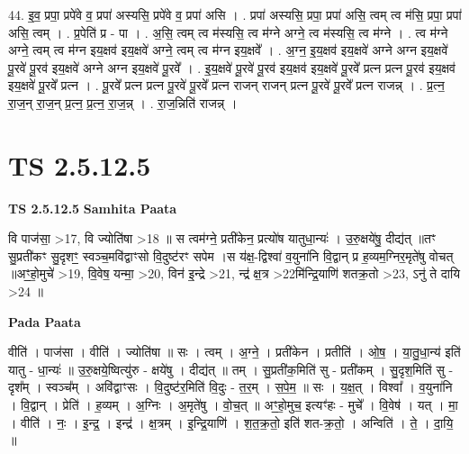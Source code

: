 \documentclass[17pt]{extarticle}
\begin{document}
44. इ॒व॒ प्रपा॒ प्रपे॑वे व॒ प्रपा॑ अस्यसि॒ प्रपे॑वे व॒ प्रपा॑ असि । . प्रपा॑ अस्यसि॒ प्रपा॒ प्रपा॑ असि॒ त्वम् त्व म॑सि॒ प्रपा॒ प्रपा॑ असि॒ त्वम् । . प्र॒पेति॑ प्र - पा । . अ॒सि॒ त्वम् त्व म॑स्यसि॒ त्व म॑ग्ने अग्ने॒ त्व म॑स्यसि॒ त्व म॑ग्ने । . त्व म॑ग्ने अग्ने॒ त्वम् त्व म॑ग्न इय॒क्षव॑ इय॒क्षवे॑ अग्ने॒ त्वम् त्व म॑ग्न इय॒क्षवे᳚ । . अ॒ग्न॒ इ॒य॒क्षव॑ इय॒क्षवे॑ अग्ने अग्न इय॒क्षवे॑ पू॒रवे॑ पू॒रव॑ इय॒क्षवे॑ अग्ने अग्न इय॒क्षवे॑ पू॒रवे᳚ । . इ॒य॒क्षवे॑ पू॒रवे॑ पू॒रव॑ इय॒क्षव॑ इय॒क्षवे॑ पू॒रवे᳚ प्रत्न प्रत्न पू॒रव॑ इय॒क्षव॑ इय॒क्षवे॑ पू॒रवे᳚ प्रत्न । . पू॒रवे᳚ प्रत्न प्रत्न पू॒रवे॑ पू॒रवे᳚ प्रत्न राजन् राजन् प्रत्न पू॒रवे॑ पू॒रवे᳚ प्रत्न राजन्न् । . प्र॒त्न॒ रा॒ज॒न् रा॒ज॒न् प्र॒त्न॒ प्र॒त्न॒ रा॒ज॒न्न् । . रा॒ज॒न्निति॑ राजन्न् । \newline
\pagebreak
{}

\section{ TS 2.5.12.5 }

\textbf{TS 2.5.12.5 } \newline
\textbf{Samhita Paata} \newline

वि पाज॑सा॒ >17, वि ज्योति॑षा >18 ॥ स त्वम॑ग्ने॒ प्रती॑केन॒ प्रत्यो॑ष यातुधा॒न्यः॑ । उ॒रु॒क्षये॑षु॒ दीद्य॑त् ॥तꣳ सु॒प्रती॑कꣳ सु॒दृशꣳ॒॒ स्वञ्च॒मवि॑द्वाꣳसो वि॒दुष्ट॑रꣳ सपेम ।स य॑क्ष॒-द्विश्वा॑ व॒युना॑नि वि॒द्वान् प्र ह॒व्यम॒ग्निर॒मृते॑षु वोचत् ॥अꣳ॒॒हो॒मुचे॑ >19, वि॒वेष॒ यन्मा॒ >20, विन॑ इ॒न्द्रे >21, न्द्र॑ क्ष॒त्र >22मि॑न्द्रि॒याणि॑ शतक्र॒तो >23, ऽनु॑ ते दायि >24 ॥ \newline

\textbf{Pada Paata} \newline

वीति॑ । पाज॑सा । वीति॑ । ज्योति॑षा ॥ सः । त्वम् । अ॒ग्ने॒ । प्रती॑केन । प्रतीति॑ । ओ॒ष॒ । या॒तु॒धा॒न्य॑ इति॑ यातु - धा॒न्यः॑ ॥ उ॒रु॒क्षये॒ष्वित्यु॑रु - क्षये॑षु । दीद्य॑त् ॥ तम् । सु॒प्रती॑क॒मिति॑ सु - प्रती॑कम् । सु॒दृश॒मिति॑ सु - दृश᳚म् । स्वञ्च᳚म् । अवि॑द्वाꣳसः । वि॒दुष्ट॑र॒मिति॑ वि॒दुः - त॒र॒म् । स॒पे॒म॒ ॥ सः । य॒क्ष॒त् । विश्वा᳚ । व॒युना॑नि । वि॒द्वान् । प्रेति॑ । ह॒व्यम् । अ॒ग्निः । अ॒मृते॑षु । वो॒च॒त् ॥ अꣳ॒॒हो॒मुच॒ इत्यꣳ॑हः - मुचे᳚ । वि॒वेष॑ । यत् । मा॒ । वीति॑ । नः॒ । इ॒न्द्र॒ । इन्द्र॑ । क्ष॒त्रम् । इ॒न्द्रि॒याणि॑ । श॒त॒क्र॒तो॒ इति॑ शत-क्र॒तो॒ । अन्विति॑ । ते॒ । दा॒यि॒ ॥  \newline
\end{document}

